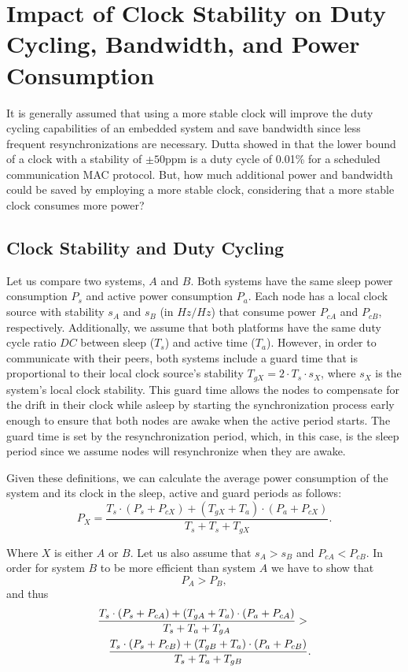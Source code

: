 \section{Impact of Clock Stability on Duty Cycling, Bandwidth, and Power Consumption}
\label{sec:power}

It is generally assumed that using a more stable clock will improve the duty
cycling capabilities of an embedded system and save bandwidth since less 
frequent resynchronizations are necessary. Dutta
showed in \cite{dutta2007procrastination} that the lower bound of a clock with
a stability of $\pm 50$ppm is a duty cycle of 0.01\% for a scheduled
communication MAC protocol. But, how much additional power and bandwidth could be saved by
employing a more stable clock, considering that a more stable clock consumes
more power? 

\subsection{Clock Stability and Duty Cycling}
Let us compare two systems, $A$ and $B$. Both systems have the same sleep power
consumption $P_s$ and active power consumption $P_a$.  Each node has a local
clock source with stability $s_A$ and $s_B$ (in $Hz/Hz$) that consume power $P_{cA}$ and $P_{cB}$,
respectively. Additionally, we assume that both platforms have the same duty
cycle ratio $DC$ between sleep ($T_s$) and active time ($T_a$). However, in order
to communicate with their peers, both systems include a guard time that is
proportional to their local clock source's stability $T_{gX} = 2 \cdot T_s \cdot
s_X$, where $s_X$ is the system's local clock stability. This guard time
allows the nodes to compensate for the drift in their clock while asleep by starting 
the synchronization process early enough to ensure that both nodes are awake when 
the active period starts. The guard time is set by the resynchronization period, which,
 in this case, is the sleep period since we assume nodes will resynchronize when 
they are awake.

Given these definitions, we can calculate the average power consumption of the
system and its clock in the sleep, active and guard periods as follows:
\begin{equation}
	P_X = \frac{T_s \cdot (P_s + P_{cX}) + (T_{gX} + T_a) \cdot (P_a + P_{cX})}{T_s + T_s + T_{gX}}.
\end{equation}

Where $X$ is either $A$ or $B$. Let us also assume that $s_A > s_B$ and $P_{cA} < P_{cB}$. In order for
system $B$ to be more efficient than system $A$ we have to show that
\begin{equation}
	P_A > P_B,
\end{equation}
and thus
\begin{eqnarray}
	\lefteqn{\frac{T_s \cdot (P_s + P_{cA}) + (T_{gA} + T_a) \cdot (P_a + P_{cA})}{T_s + T_a + T_{gA}}  > } \nonumber \\
	& & \frac{T_s \cdot (P_s + P_{cB}) + (T_{gB} + T_a) \cdot (P_a +
	P_{cB})}{T_s + T_a + T_{gB}}.\label{eq:1}
\end{eqnarray}

